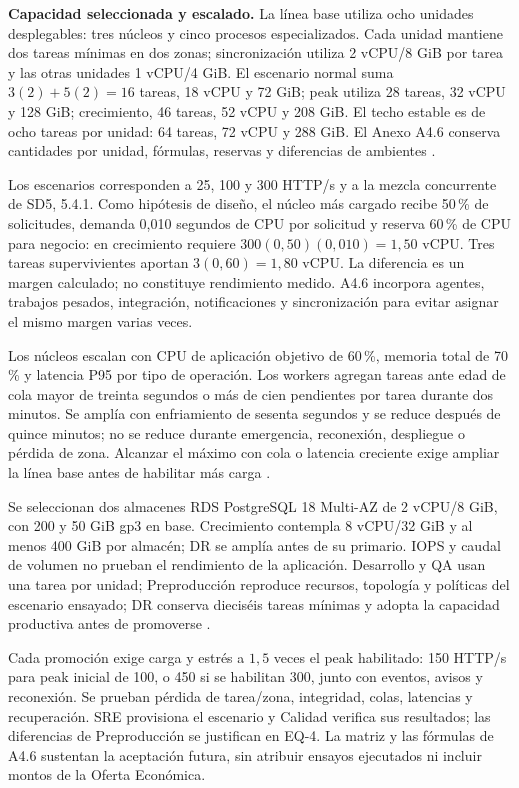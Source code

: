 \textbf{Capacidad seleccionada y escalado.}
La línea base utiliza ocho unidades desplegables: tres núcleos y cinco procesos especializados. Cada unidad mantiene dos tareas mínimas en dos zonas; sincronización utiliza 2 vCPU/8 GiB por tarea y las otras unidades 1 vCPU/4 GiB. El escenario normal suma $3(2)+5(2)=16$ tareas, 18 vCPU y 72 GiB; peak utiliza 28 tareas, 32 vCPU y 128 GiB; crecimiento, 46 tareas, 52 vCPU y 208 GiB. El techo estable es de ocho tareas por unidad: 64 tareas, 72 vCPU y 288 GiB. El Anexo A4.6 conserva cantidades por unidad, fórmulas, reservas y diferencias de ambientes \parencite{c8-fargate-recursos}.

Los escenarios corresponden a 25, 100 y 300 HTTP/s y a la mezcla concurrente de SD5, 5.4.1. Como hipótesis de diseño, el núcleo más cargado recibe 50\,\% de solicitudes, demanda 0,010 segundos de CPU por solicitud y reserva 60\,\% de CPU para negocio: en crecimiento requiere $300(0,50)(0,010)=1,50$ vCPU. Tres tareas supervivientes aportan $3(0,60)=1,80$ vCPU. La diferencia es un margen calculado; no constituye rendimiento medido. A4.6 incorpora agentes, trabajos pesados, integración, notificaciones y sincronización para evitar asignar el mismo margen varias veces.

Los núcleos escalan con CPU de aplicación objetivo de 60\,\%, memoria total de 70\,\% y latencia P95 por tipo de operación. Los workers agregan tareas ante edad de cola mayor de treinta segundos o más de cien pendientes por tarea durante dos minutos. Se amplía con enfriamiento de sesenta segundos y se reduce después de quince minutos; no se reduce durante emergencia, reconexión, despliegue o pérdida de zona. Alcanzar el máximo con cola o latencia creciente exige ampliar la línea base antes de habilitar más carga \parencite{c8-ecs-autoescalado}.

Se seleccionan dos almacenes RDS PostgreSQL 18 Multi-AZ de 2 vCPU/8 GiB, con 200 y 50 GiB gp3 en base. Crecimiento contempla 8 vCPU/32 GiB y al menos 400 GiB por almacén; DR se amplía antes de su primario. IOPS y caudal de volumen no prueban el rendimiento de la aplicación. Desarrollo y QA usan una tarea por unidad; Preproducción reproduce recursos, topología y políticas del escenario ensayado; DR conserva dieciséis tareas mínimas y adopta la capacidad productiva antes de promoverse \parencites{c8-rds-clases,c8-rds-almacenamiento}.

Cada promoción exige carga y estrés a $1,5$ veces el peak habilitado: 150 HTTP/s para peak inicial de 100, o 450 si se habilitan 300, junto con eventos, avisos y reconexión. Se prueban pérdida de tarea/zona, integridad, colas, latencias y recuperación. SRE provisiona el escenario y Calidad verifica sus resultados; las diferencias de Preproducción se justifican en EQ-4. La matriz y las fórmulas de A4.6 sustentan la aceptación futura, sin atribuir ensayos ejecutados ni incluir montos de la Oferta Económica.
